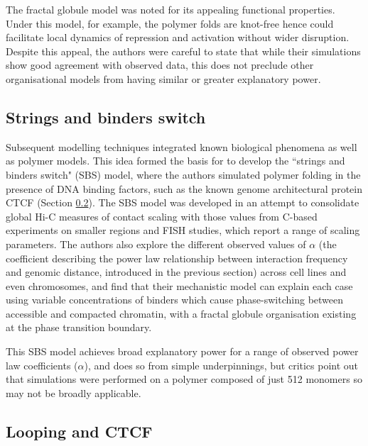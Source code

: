 \documentclass[a4paper,11pt,oneside]{book}
\begin{document}

The fractal globule model was noted for its appealing functional properties. Under this model, for example, the polymer folds are knot-free hence could facilitate local dynamics of repression and activation without wider disruption.\cite{Mirny2011} Despite this appeal, the authors were careful to state that while their simulations show good agreement with observed data, this does not preclude other organisational models from having similar or greater explanatory power.\cite{Lieberman2009}

\subsection{Strings and binders switch}\label{intro:sbs}

Subsequent modelling techniques integrated known biological phenomena as well as polymer models. This idea formed the basis for \citet{Barbieri2012} to develop the ``strings and binders switch" (SBS) model, where the authors simulated polymer folding in the presence of DNA binding factors, such as the known genome architectural protein CTCF (Section \ref{intro:loops}). The SBS model was developed in an attempt to consolidate global Hi-C measures of contact scaling with those values from C-based experiments on smaller regions and FISH studies, which report a range of scaling parameters. The authors also explore the different observed values of $\alpha$ (the coefficient describing the power law relationship between interaction frequency and genomic distance, introduced in the previous section) across cell lines and even chromosomes, and find that their mechanistic model can explain each case using variable concentrations of binders which cause phase-switching between accessible and compacted chromatin, with a fractal globule organisation existing at the phase transition boundary.\cite{Barbieri2012}

This SBS model achieves broad explanatory power for a range of observed power law coefficients ($\alpha$), and does so from simple underpinnings, but critics point out that simulations were performed on a polymer composed of just 512 monomers so may not be broadly applicable.\cite{Dekker2013}

\subsection{Looping and CTCF}\label{intro:loops}
\end{document}
